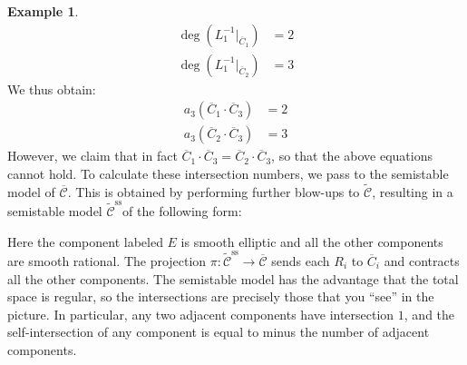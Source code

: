 \documentclass[11pt]{amsart}
\renewcommand{\to}{\rightarrow}
\newcommand{\ovm}[1]{\overline{\mathcal{#1}}}
\newcommand{\ovt}[1]{\widetilde{\mathcal{#1}}}
\newcommand{\ov}[1]{\overline{#1}}
\theoremstyle{definition}
\theoremstyle{definition}
\newtheorem{example}[thm]{Example}
\begin{document}
\begin{example}
\begin{align*} \deg(L_1^{-1}|_{\ov{C}_1}) & = 2\\
\deg(L_1^{-1}|_{\ov{C}_2}) & = 3 \end{align*}
We thus obtain:
\begin{align*} a_3 (\ov{C}_1 \cdot \ov{C}_3)&  = 2 \\
a_3 (\ov{C}_2 \cdot \ov{C}_3)& = 3 \end{align*}
However, we claim that in fact $\ov{C}_1 \cdot \ov{C}_3 = \ov{C}_2 \cdot \ov{C}_3$, so that the above equations cannot hold. To calculate these intersection numbers, we pass to the semistable model of $\ovm{C}$. This is obtained by performing further blow-ups to $\ovt{C}$, resulting in a semistable model $\ovt{C}^{\operatorname{ss}}$of the following form:
\begin{center}
\end{center}
Here the component labeled $E$ is smooth elliptic and all the other components are smooth rational. The projection $\pi: \ovt{C}^{\operatorname{ss}} \to \ovm{C}$ sends each $R_i$ to $\ov{C}_i$ and contracts all the other components. The semistable model has the advantage that the total space is regular, so the intersections are precisely those that you ``see'' in the picture. In particular, any two adjacent components have intersection $1$, and the self-intersection of any component is equal to minus the number of adjacent components.


\end{example}
\end{document}

